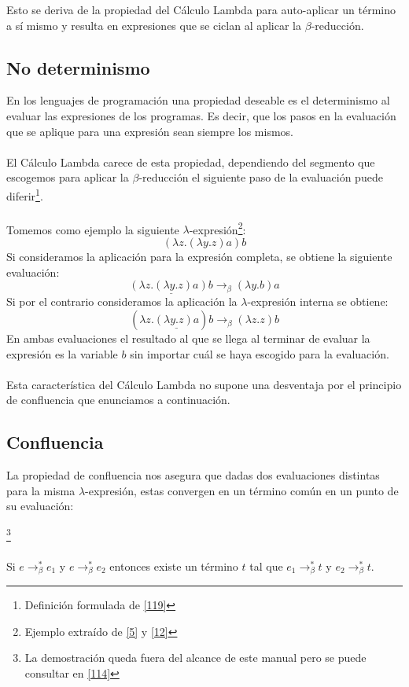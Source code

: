 	Esto se deriva de la propiedad del Cálculo Lambda para auto-aplicar un término a sí mismo y resulta en expresiones que se ciclan al aplicar la $\beta$-reducción.

                \subsection{No determinismo}
                    En los lenguajes de programación una propiedad deseable es el determinismo al evaluar las expresiones de los programas. Es decir, que los pasos en la evaluación que se aplique para una expresión sean siempre los mismos.\\\\
 El Cálculo Lambda carece de esta propiedad, dependiendo del segmento que escogemos para aplicar la $\beta$-reducción el siguiente paso de la evaluación puede diferir\footnote{Definición formulada de \hyperlink{119}{[119]}}.\\\\
		   Tomemos como ejemplo la siguiente $\lambda$-expresión\footnote{Ejemplo extraído de \hyperlink{5}{[5]} y  \hyperlink{12}{[12]} }:
                    $$(\lambda z.(\lambda y.z)a)b$$
                    Si consideramos la aplicación para la expresión completa, se obtiene la siguiente evaluación: $$\underline{(\lambda z.(\lambda y.z)a)b} \rightarrow_\beta (\lambda y.b)a$$
                    Si por el contrario consideramos la aplicación la $\lambda$-expresión interna se obtiene: $$(\lambda z.\underline{(\lambda y.z)a})b \rightarrow_\beta (\lambda z.z)b$$
                    En ambas evaluaciones el resultado al que se llega al terminar de evaluar la expresión es la variable $b$ sin importar cuál se haya escogido para la evaluación.\\\\
                    Esta característica del Cálculo Lambda no supone una desventaja por el principio de confluencia que enunciamos a continuación.

                \subsection{Confluencia}
                    La propiedad de confluencia nos asegura que dadas dos evaluaciones distintas para la misma $\lambda$-expresión, estas convergen en un término común en un punto de su evaluación:

                    \begin{theorem}\footnote{La demostración queda fuera del alcance de este manual pero se puede consultar en \hyperlink{114}{[114]}}\\\\
 Si $e\to_\beta^* e_1$ y $e\to_\beta^*e_2$ entonces existe un término $t$ tal que  $e_1\to_\beta^* t$ y $e_2\to_\beta^* t$.
                    \end{theorem}

